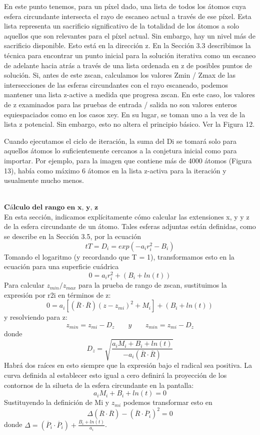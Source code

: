 En este punto tenemos, para un píxel dado, una lista de todos los átomos cuya esfera circundante intersecta el rayo de escaneo actual a través de ese píxel. Esta lista representa un sacrificio significativo de la totalidad de los átomos a solo aquellos que son relevantes para el píxel actual. Sin embargo, hay un nivel más de sacrificio disponible. Esto está en la dirección z. En la Sección 3.3 describimos la técnica para encontrar un punto inicial para la solución iterativa como un escaneo de adelante hacia atrás a través de una lista ordenada en z de posibles puntos de solución. Si, antes de este zscan, calculamos los valores Zmin / Zmax de las intersecciones de las esferas circundantes con el rayo escaneado, podemos mantener una lista z-active a medida que progresa zscan. En este caso, los valores de z examinados para las pruebas de entrada / salida no son valores enteros equiespaciados como en los casos xey. En su lugar, se toman uno a la vez de la lista z potencial. Sin embargo, esto no altera el principio básico. Ver la Figura 12.

Cuando ejecutamos el ciclo de iteración, la suma del Di se tomará solo para aquellos átomos lo suficientemente cercanos a la conjetura inicial como para importar. Por ejemplo, para la imagen que contiene más de 4000 átomos (Figura 13), había como máximo 6 átomos en la lista z-activa para la iteración y usualmente mucho menos.


${ }$\\
$\textbf{Cálculo del rango en x, y, z}$
${ }$\\

En esta sección, indicamos explícitamente cómo calcular las extensiones x, y y z de la esfera circundante de un átomo. Tales esferas adjuntas están definidas, como se describe en la Sección 3.5, por la ecuación
\[
	tT = D_i = exp (-a_i r^{2}_{i} - B_i)
\]
Tomando el logaritmo (y recordando que T = 1), transformamos esto en la ecuación para una superficie cuádrica
\[
	0 = a_i r^{2}_{i} + (B_i + ln(t))
\]
Para calcular $z_ {min} / z_ {max}$ para la prueba de rango de zscan, sustituimos la expresión por r2i en términos de z:
\[
	0 = a_i [(\overline{R} \cdot \overline{R})(z-z_{mi})^2 + M_i] + (B_i + ln(t))
\]
y resolviendo para z:
\[
	z_{min} = z_{mi} - D_z \;\;\;\;\;\;\; y \;\;\;\;\;\;\; z_{min} = z_{mi} - D_z
\]
donde
\[
	D_z = \sqrt{\frac{a_i M_i + B_i + ln(t)}{-a_i(\overline{R} \cdot \overline{R})}}
\]
Habrá dos raíces en esto siempre que la expresión bajo el radical sea positiva. La curva definida al establecer esto igual a cero definirá la proyección de los contornos de la silueta de la esfera circundante en la pantalla:
\[
	a_i M_i + B_i + ln(t) = 0
\]
Sustituyendo la definición de Mi y $z_ {mi}$ podemos transformar esto en
\[
	\Delta (\overline{R} \cdot \overline{R}) - (\overline{R} \cdot \overline{P}_i)^2 = 0
\]
donde $\Delta = (\overline{P}_i \cdot \overline{P}_i) + \frac{B_i + ln(t)}{a_i}$.

